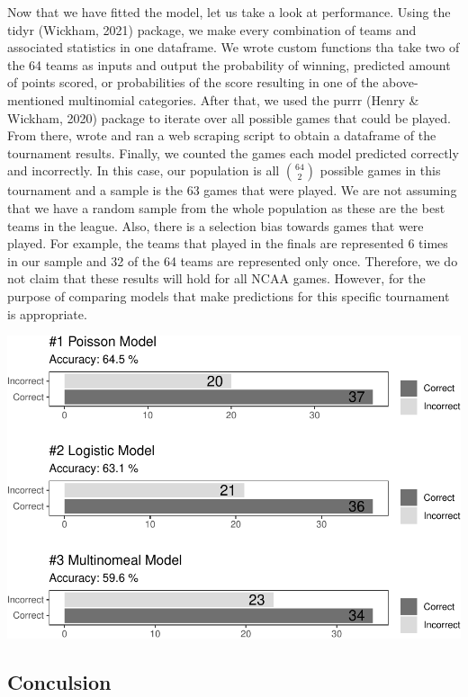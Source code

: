 \documentclass[
  english,
  man,floatsintext]{apa6}
\begin{document}
Now that we have fitted the model, let us take a look at performance. Using the tidyr (Wickham, 2021) package, we make every combination of teams and associated statistics in one dataframe. We wrote custom functions tha take two of the 64 teams as inputs and output the probability of winning, predicted amount of points scored, or probabilities of the score resulting in one of the above-mentioned multinomial categories. After that, we used the purrr (Henry \& Wickham, 2020) package to iterate over all possible games that could be played. From there, wrote and ran a web scraping script to obtain a dataframe of the tournament results. Finally, we counted the games each model predicted correctly and incorrectly. In this case, our population is all \({64\choose 2}\) possible games in this tournament and a sample is the 63 games that were played. We are not assuming that we have a random sample from the whole population as these are the best teams in the league. Also, there is a selection bias towards games that were played. For example, the teams that played in the finals are represented 6 times in our sample and 32 of the 64 teams are represented only once. Therefore, we do not claim that these results will hold for all NCAA games. However, for the purpose of comparing models that make predictions for this specific tournament is appropriate.

\includegraphics{paper_files/figure-latex/unnamed-chunk-6-1.pdf}

\hypertarget{conculsion}{%
\subsection{Conculsion}\label{conculsion}}
\end{document}
